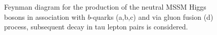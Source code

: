 \begin{figure}[tp]
     \begin{center}
     \hspace{0.2cm}	
     	\hspace{0.2cm}	
     \end{center}
    \caption{Feynman diagram for the production of the neutral MSSM Higgs bosons in association with  $b$-quarks (a,b,c) and via gluon fusion (d) 
	process, subsequent decay in tau lepton pairs is considered.}
   \label{fig:feyndiagSignal}
\end{figure}


